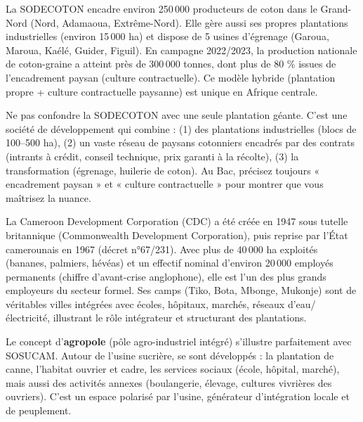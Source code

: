 \documentclass[11pt]{article}
\begin{document}
\begin{exemplebox}
La SODECOTON encadre environ 250\,000 producteurs de coton dans le Grand-Nord (Nord, Adamaoua, Extrême-Nord). Elle gère aussi ses propres plantations industrielles (environ 15\,000 ha) et dispose de 5 usines d'égrenage (Garoua, Maroua, Kaélé, Guider, Figuil). En campagne 2022/2023, la production nationale de coton-graine a atteint près de 300\,000 tonnes, dont plus de 80 \% issues de l'encadrement paysan (culture contractuelle). Ce modèle hybride (plantation propre + culture contractuelle paysanne) est unique en Afrique centrale.
\end{exemplebox}

\begin{attention}
Ne pas confondre la SODECOTON avec une seule plantation géante. C'est une société de développement qui combine : (1) des plantations industrielles (blocs de 100--500 ha), (2) un vaste réseau de paysans cotonniers encadrés par des contrats (intrants à crédit, conseil technique, prix garanti à la récolte), (3) la transformation (égrenage, huilerie de coton). Au Bac, précisez toujours « encadrement paysan » et « culture contractuelle » pour montrer que vous maîtrisez la nuance.
\end{attention}

\begin{savaistu}
La Cameroon Development Corporation (CDC) a été créée en 1947 sous tutelle britannique (Commonwealth Development Corporation), puis reprise par l'État camerounais en 1967 (décret n°67/231). Avec plus de 40\,000 ha exploités (bananes, palmiers, hévéas) et un effectif nominal d'environ 20\,000 employés permanents (chiffre d'avant-crise anglophone), elle est l'un des plus grands employeurs du secteur formel. Ses camps (Tiko, Bota, Mbonge, Mukonje) sont de véritables villes intégrées avec écoles, hôpitaux, marchés, réseaux d'eau/électricité, illustrant le rôle intégrateur et structurant des plantations.
\end{savaistu}

\begin{savaistu}
Le concept d'\textbf{agropole} (pôle agro-industriel intégré) s'illustre parfaitement avec SOSUCAM. Autour de l'usine sucrière, se sont développés : la plantation de canne, l'habitat ouvrier et cadre, les services sociaux (école, hôpital, marché), mais aussi des activités annexes (boulangerie, élevage, cultures vivrières des ouvriers). C'est un espace polarisé par l'usine, générateur d'intégration locale et de peuplement.
\end{savaistu}
\end{document}
